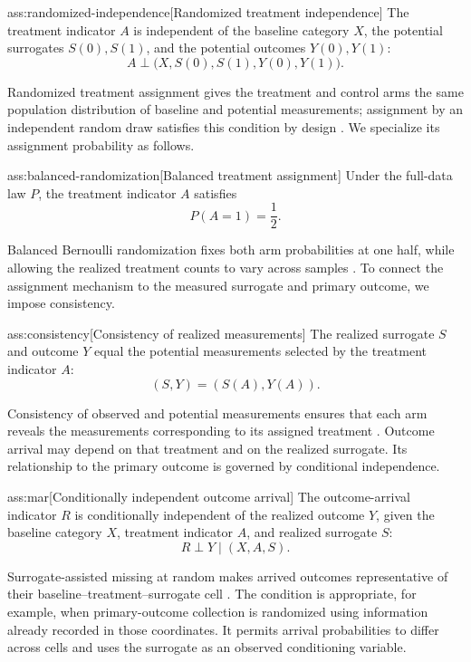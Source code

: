 \begin{assumptionv}{ass:randomized-independence}[Randomized treatment independence]
The treatment indicator \(A\) is independent of the baseline category \(X\), the potential surrogates \(S(0),S(1)\), and the potential outcomes \(Y(0),Y(1)\):
\[
A\perp \bigl(X,S(0),S(1),Y(0),Y(1)\bigr).
\]
\end{assumptionv}

Randomized treatment assignment gives the treatment and control arms the same population distribution of baseline and potential measurements; assignment by an independent random draw satisfies this condition by design \citep{ImbensRubin2015}. We specialize its assignment probability as follows.

\begin{assumptionv}{ass:balanced-randomization}[Balanced treatment assignment]
Under the full-data law \(P\), the treatment indicator \(A\) satisfies
\[
P(A=1)=\frac12.
\]
\end{assumptionv}

Balanced Bernoulli randomization fixes both arm probabilities at one half, while allowing the realized treatment counts to vary across samples \citep{ImbensRubin2015}. To connect the assignment mechanism to the measured surrogate and primary outcome, we impose consistency.

\begin{assumptionv}{ass:consistency}[Consistency of realized measurements]
The realized surrogate \(S\) and outcome \(Y\) equal the potential measurements selected by the treatment indicator \(A\):
\[
(S,Y)=(S(A),Y(A)).
\]
\end{assumptionv}

Consistency of observed and potential measurements ensures that each arm reveals the measurements corresponding to its assigned treatment \citep{KallusMao2025}. Outcome arrival may depend on that treatment and on the realized surrogate. Its relationship to the primary outcome is governed by conditional independence.

\begin{assumptionv}{ass:mar}[Conditionally independent outcome arrival]
The outcome-arrival indicator \(R\) is conditionally independent of the realized outcome \(Y\), given the baseline category \(X\), treatment indicator \(A\), and realized surrogate \(S\):
\[
R\perp Y\mid(X,A,S).
\]
\end{assumptionv}

Surrogate-assisted missing at random makes arrived outcomes representative of their baseline--treatment--surrogate cell \citep{KallusMao2025}. The condition is appropriate, for example, when primary-outcome collection is randomized using information already recorded in those coordinates. It permits arrival probabilities to differ across cells and uses the surrogate as an observed conditioning variable.

